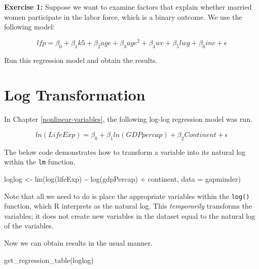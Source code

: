 \documentclass[
]{book}
\makeatletter
\newenvironment{Shaded}{\begin{snugshade}}{\end{snugshade}}
\newcommand{\AttributeTok}[1]{\textcolor[rgb]{0.61,0.61,0.61}{#1}}
\newcommand{\FunctionTok}[1]{\textcolor[rgb]{0,0,0}{#1}}
\newcommand{\NormalTok}[1]{#1}
\newcommand{\OtherTok}[1]{\textcolor[rgb]{0.37,0.37,0.37}{#1}}
\newcommand{\SpecialCharTok}[1]{\textcolor[rgb]{0,0,0}{#1}}
\newenvironment{kframe}{%
\medskip{}
\setlength{\fboxsep}{.8em}
 \def\at@end@of@kframe{}%
 \ifinner\ifhmode%
  \def\at@end@of@kframe{\end{minipage}}%
  \begin{minipage}{\columnwidth}%
 \fi\fi%
 \def\FrameCommand##1{\hskip\@totalleftmargin \hskip-\fboxsep
 \colorbox{shadecolor}{##1}\hskip-\fboxsep
     \hskip-\linewidth \hskip-\@totalleftmargin \hskip\columnwidth}%
 \MakeFramed {\advance\hsize-\width
   \@totalleftmargin\z@ \linewidth\hsize
   \@setminipage}}%
 {\par\unskip\endMakeFramed%
 \at@end@of@kframe}
\renewenvironment{Shaded}{\begin{kframe}}{\end{kframe}}
\newenvironment{rmdblock}[1]
  {\begin{shaded*}
  }
  {\end{shaded*}
  }
\newenvironment{learncheck}
  {\begin{rmdblock}{warning}}
  {\end{rmdblock}}
\makeatother
\begin{document}
\begin{learncheck}
\textbf{Exercise 1:} Suppose we want to examine factors that explain
whether married women participate in the labor force, which is a binary
outcome. We use the following model:

\begin{equation}
lfp = \beta_0 + \beta_1k5 + \beta_2age + \beta_3age^2 + \beta_4wc + \beta_5lwg + \beta_6inc + \epsilon
\end{equation}

Run this regression model and obtain the results.
\end{learncheck}

\hypertarget{log-transformation}{%
\section{Log Transformation}\label{log-transformation}}

In Chapter \ref{nonlinear-variables}, the following log-log regression model was run.

\begin{equation}
ln(LifeExp)=\beta_0 + \beta_1ln(GDPpercap) + \beta_2Continent + \epsilon
\end{equation}

The below code demonstrates how to transform a variable into its natural log within the \texttt{lm} function.

\begin{Shaded}
\begin{Highlighting}[]
\NormalTok{loglog }\OtherTok{\textless{}{-}} \FunctionTok{lm}\NormalTok{(}\FunctionTok{log}\NormalTok{(lifeExp) }\SpecialCharTok{\textasciitilde{}} \FunctionTok{log}\NormalTok{(gdpPercap) }\SpecialCharTok{+}\NormalTok{ continent, }\AttributeTok{data =}\NormalTok{ gapminder)}
\end{Highlighting}
\end{Shaded}

Note that all we need to do is place the appropriate variables within the \texttt{log()} function, which R interprets as the natural log. This \emph{temporarily} transforms the variables; it does not create new variables in the dataset equal to the natural log of the variables.

Now we can obtain results in the usual manner.

\begin{Shaded}
\begin{Highlighting}[]
\FunctionTok{get\_regression\_table}\NormalTok{(loglog)}
\end{Highlighting}
\end{Shaded}
\end{document}
